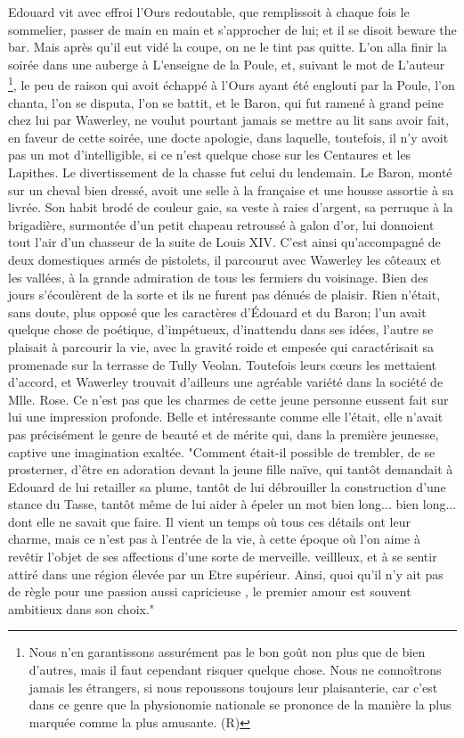 Edouard vit avec effroi l'Ours redoutable, que remplissoit à chaque fois le sommelier, passer de main en main et s'approcher de lui; et il se disoit beware the bar. Mais après qu'il eut vidé la coupe, on ne le tint pas quitte. L'on alla finir la soirée dans une auberge à L'enseigne de la Poule, et, suivant le mot de\setcounter{page}{552} L'auteur \footnote{Nous n'en garantissons assurément pas le bon goût non plus que de bien d'autres, mais il faut cependant risquer quelque chose. Nous ne connoîtrons jamais les étrangers, si nous repoussons toujours leur plaisanterie, car c'est dans ce genre que la physionomie nationale se prononce de la manière la plus marquée comme la plus amusante. (R)}, le peu de raison qui avoit échappé à l'Ours ayant été englouti par la Poule, l'on chanta, l'on se disputa, l'on se battit, et le Baron, qui fut ramené à grand peine chez lui par Wawerley, ne voulut pourtant jamais se mettre au lit sans avoir fait, en faveur de cette soirée, une docte apologie, dans laquelle, toutefois, il n'y avoit pas un mot d'intelligible, si ce n'est quelque chose sur les Centaures et les Lapithes.
Le divertissement de la chasse fut celui du lendemain. Le Baron, monté sur un cheval bien dressé, avoit une selle à la française et une housse assortie à sa livrée. Son habit brodé de couleur gaie, sa veste à raies d'argent, sa perruque à la brigadière, surmontée d'un petit chapeau retroussé à galon d'or, lui donnoient tout l'air d'un chasseur de la suite de Louis XIV. C'est ainsi qu'accompagné de deux domestiques armés de pistolets, il parcourut avec Wawerley les côteaux et les vallées, à la grande admiration de tous les fermiers du voisinage.\setcounter{page}{553} Bien des jours s'écoulèrent de la sorte et ils ne furent pas dénués de plaisir. Rien n'était, sans doute, plus opposé que les caractères d'Édouard et du Baron; l'un avait quelque chose de poétique, d'impétueux, d'inattendu dans ses idées, l'autre se plaisait à parcourir la vie, avec la gravité roide et empesée qui caractérisait sa promenade sur la terrasse de Tully Veolan. Toutefois leurs cœurs les mettaient d'accord, et Wawerley trouvait d'ailleurs une agréable variété dans la société de Mlle. Rose. Ce n'est pas que les charmes de cette jeune personne eussent fait sur lui une impression profonde. Belle et intéressante comme elle l'était, elle n'avait pas précisément le genre de beauté et de mérite qui, dans la première jeunesse, captive une imagination exaltée. "Comment était-il possible de trembler, de se prosterner, d'être en adoration devant la jeune fille naïve, qui tantôt demandait à Edouard de lui retailler sa plume, tantôt de lui débrouiller la construction d'une stance du Tasse, tantôt même de lui aider à épeler un mot bien long... bien long... dont elle ne savait que faire. Il vient un temps où tous ces détails ont leur charme, mais ce n'est pas à l'entrée de la vie, à cette époque où l'on aime à revêtir l'objet de ses affections d'une sorte de merveille.\setcounter{page}{554} veillleux, et à se sentir attiré dans une région élevée par un Etre supérieur. Ainsi, quoi qu'il n'y ait pas de règle pour une passion aussi capricieuse , le premier amour est souvent ambitieux dans son choix."
